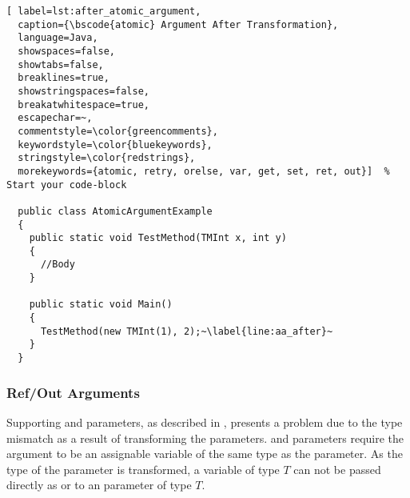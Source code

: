 \begin{lstlisting}[ label=lst:after_atomic_argument,
  caption={\bscode{atomic} Argument After Transformation},
  language=Java,  
  showspaces=false,
  showtabs=false,
  breaklines=true,
  showstringspaces=false,
  breakatwhitespace=true,
  escapechar=~,
  commentstyle=\color{greencomments},
  keywordstyle=\color{bluekeywords},
  stringstyle=\color{redstrings},
  morekeywords={atomic, retry, orelse, var, get, set, ret, out}]  % Start your code-block

  public class AtomicArgumentExample
  {
    public static void TestMethod(TMInt x, int y)
    {
      //Body
    }

    public static void Main()
    {
      TestMethod(new TMInt(1), 2);~\label{line:aa_after}~
    }
  }
\end{lstlisting}


\subsubsection{Ref/Out Arguments}
Supporting   and  parameters, as described in , presents a problem due to the type mismatch as a result of transforming the parameters.  and  parameters require the argument to be an assignable variable of the same type as the parameter. As the type of the parameter is transformed, a variable of type $T$ can not be passed directly as  or  to an  parameter of type $T$.

